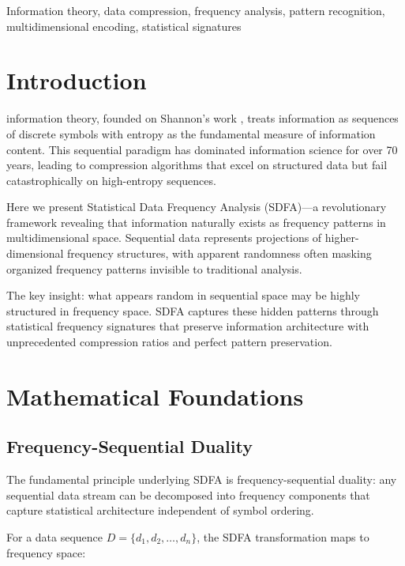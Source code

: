 \documentclass[10pt,journal,compsoc]{IEEEtran}
\newcommand{\sdfa}{\textsc{SDFA}}
\begin{document}
\begin{IEEEkeywords}
Information theory, data compression, frequency analysis, pattern recognition, multidimensional encoding, statistical signatures
\end{IEEEkeywords}

\IEEEpeerreviewmaketitle

\section{Introduction}

 information theory, founded on Shannon's work \cite{shannon_mathematical_1948}, treats information as sequences of discrete symbols with entropy as the fundamental measure of information content. This sequential paradigm has dominated information science for over 70 years, leading to compression algorithms that excel on structured data but fail catastrophically on high-entropy sequences.

Here we present Statistical Data Frequency Analysis (\sdfa)—a revolutionary framework revealing that information naturally exists as frequency patterns in multidimensional space. Sequential data represents projections of higher-dimensional frequency structures, with apparent randomness often masking organized frequency patterns invisible to traditional analysis.

The key insight: what appears random in sequential space may be highly structured in frequency space. \sdfa{} captures these hidden patterns through statistical frequency signatures that preserve information architecture with unprecedented compression ratios and perfect pattern preservation.

\section{Mathematical Foundations}

\subsection{Frequency-Sequential Duality}

The fundamental principle underlying \sdfa{} is frequency-sequential duality: any sequential data stream can be decomposed into frequency components that capture statistical architecture independent of symbol ordering.

For a data sequence $D = \{d_1, d_2, \ldots, d_n\}$, the \sdfa{} transformation maps to frequency space:
\end{document}
